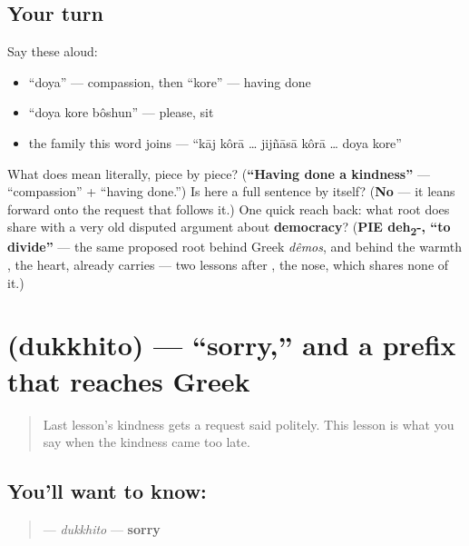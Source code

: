 \subsection*{Your turn}
Say these aloud:

\begin{itemize}
\raggedright
  \item \textquotedblleft{}doya\textquotedblright{} — compassion, then \textquotedblleft{}kore\textquotedblright{} — having done
  \item \textquotedblleft{}doya kore bôshun\textquotedblright{} — please, sit
  \item the family this word joins — \textquotedblleft{}kāj kôrā … jijñāsā kôrā … doya kore\textquotedblright{}
\end{itemize}

\begin{tcolorbox}[breakable,colback=teal!4,colframe=teal!35!black,title={Before you move on}]
What does   mean literally, piece by piece? (\textbf{\textquotedblleft{}Having done a kindness\textquotedblright{}} —  \textquotedblleft{}compassion\textquotedblright{} +  \textquotedblleft{}having done.\textquotedblright{}) Is  here a full sentence by itself? (\textbf{No} — it leans forward onto the request that follows it.) One quick reach back: what root does  share with a very old disputed argument about \textbf{democracy}? (\textbf{PIE deh\textsubscript{2}-, \textquotedblleft{}to divide\textquotedblright{}} — the same proposed root behind Greek \emph{dêmos}, and behind the warmth \textbf{}, the heart, already carries — two lessons after , the nose, which shares none of it.)
\end{tcolorbox}
\section[\texorpdfstring{\bn{দুঃখিত} (dukkhito)}{দুঃখিত (dukkhito)}]{ (dukkhito) — \textquotedblleft{}sorry,\textquotedblright{} and a prefix that reaches Greek}

\label{lesson:BN-C13-dukkhito}



\begin{quote}
Last lesson's kindness gets a request said politely. This lesson is what you say when the kindness came too late.
\end{quote}

\subsection*{You'll want to know: }
\begin{quote}
\textbf{} — \emph{dukkhito} — \textbf{sorry}
\end{quote}

